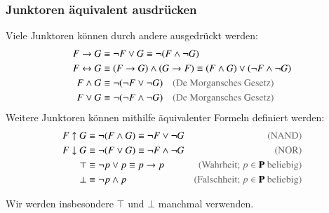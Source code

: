\documentclass[aspectratio=1610,onlymath]{beamer}
\let\beameroriginaldoublebackslash\\
\let\\=\beameroriginaldoublebackslash
\begin{document}
\begin{frame}\frametitle{Junktoren äquivalent ausdrücken}

Viele Junktoren können durch andere ausgedrückt werden:
% 
\begin{align*}
F\to G & \equiv \neg F\vee G \equiv \neg(F\wedge\neg G) \\
F\leftrightarrow G & \equiv (F\to G)\wedge(G\to F)\equiv (F\wedge G)\vee(\neg F\wedge \neg G) \\
F\wedge G & \equiv \neg(\neg F\vee\neg G) \quad \text{\textcolor{devilscss}{(De Morgansches Gesetz)}} \\
F\vee G & \equiv \neg(\neg F\wedge\neg G) \quad \text{\textcolor{devilscss}{(De Morgansches Gesetz)}}
\end{align*}\pause
%
Weitere Junktoren können mithilfe äquivalenter Formeln definiert werden:
% 
\begin{align*}
F\uparrow G & \equiv \neg (F\wedge G) \equiv \neg F\vee \neg G & \text{\textcolor{devilscss}{(NAND)}}\\
F\downarrow G & \equiv \neg (F\vee G) \equiv \neg F\wedge \neg G & \text{\textcolor{devilscss}{(NOR)}}\\
\top & \equiv \neg p\vee p \equiv p\to p & \text{\textcolor{devilscss}{(Wahrheit; $p\in\Slang{P}$ beliebig)}} \\
\bot & \equiv \neg p\wedge p & \text{\textcolor{devilscss}{(Falschheit; $p\in\Slang{P}$ beliebig)}}
\end{align*}\vspace{-4ex}

Wir werden insbesondere $\top$ und $\bot$ manchmal verwenden.

\end{frame}
\end{document}
